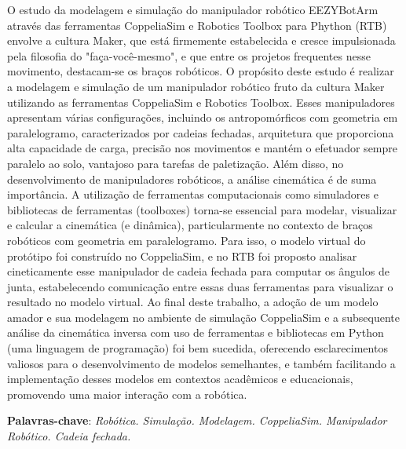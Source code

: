 \setlength{\absparsep}{18pt} %
\begin{resumo}

     O estudo da modelagem e simulação do manipulador robótico EEZYBotArm através das ferramentas CoppeliaSim e Robotics Toolbox para Phython (RTB) envolve a cultura Maker, que está firmemente estabelecida e cresce impulsionada pela filosofia do "faça-você-mesmo", e que entre os projetos frequentes nesse movimento, destacam-se os braços robóticos. O propósito deste estudo é realizar a modelagem e simulação de um manipulador robótico fruto da cultura Maker utilizando as ferramentas CoppeliaSim e Robotics Toolbox. Esses manipuladores apresentam várias configurações, incluindo os antropomórficos com geometria em paralelogramo, caracterizados por cadeias fechadas, arquitetura que proporciona alta capacidade de carga, precisão nos movimentos e mantém o efetuador sempre paralelo ao solo, vantajoso para tarefas de paletização. Além disso, no desenvolvimento de manipuladores robóticos, a análise cinemática é de suma importância. A utilização de ferramentas computacionais como simuladores e bibliotecas de ferramentas (toolboxes) torna-se essencial para modelar, visualizar e calcular a cinemática (e dinâmica), particularmente no contexto de braços robóticos com geometria em paralelogramo. Para isso, o modelo virtual do protótipo foi construído no CoppeliaSim, e no RTB foi proposto analisar cineticamente esse manipulador de cadeia fechada para computar os ângulos de junta, estabelecendo comunicação entre essas duas ferramentas para visualizar o resultado no modelo virtual. Ao final deste trabalho, a adoção de um modelo amador e sua modelagem no ambiente de simulação CoppeliaSim e a subsequente análise da cinemática inversa com uso de ferramentas e bibliotecas em Python (uma linguagem de programação) foi bem sucedida, oferecendo esclarecimentos valiosos para o desenvolvimento de modelos semelhantes, e também facilitando a implementação desses modelos em contextos acadêmicos e educacionais, promovendo uma maior interação com a robótica. 
	

 \textbf{Palavras-chave}: \textit{Robótica. Simulação. Modelagem. CoppeliaSim. Manipulador Robótico. Cadeia fechada.}

\end{resumo}

